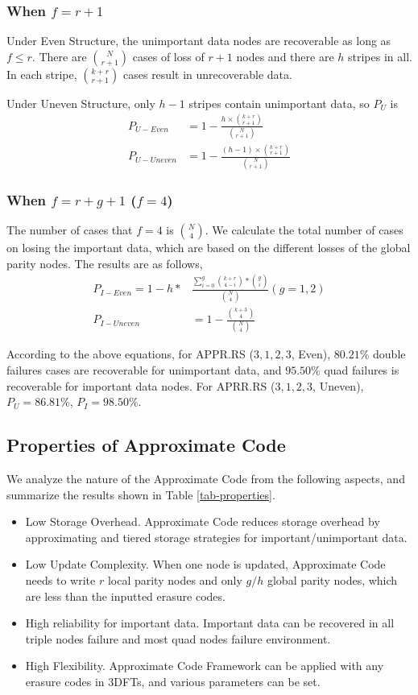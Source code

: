 \documentclass[sigconf]{acmart}
\begin{document}
\subsubsection{When $f=r+1$}
Under Even Structure, the unimportant data nodes are recoverable as long as $f \leqslant r$.
There are $\binom{N}{r+1}$ cases of loss of $r+1$ nodes and there are $h$ stripes in all. In each stripe, $\binom{k+r}{r+1}$ cases result in unrecoverable data.

Under Uneven Structure, only $h-1$ stripes contain unimportant data, so $P_{U}$ is
\begin{align}
    P_{U-Even} &= 1 - \frac{h \times \binom{k+r}{r+1}}{\binom{N}{r+1}}\\
    P_{U-Uneven} &= 1 - \frac{(h-1) \times \binom{k+r}{r+1}}{\binom{N}{r+1}}
\end{align}

\subsubsection{When $f=r+g+1$ ($f=4$)}
The number of cases that $f=4$ is $\binom{N}{4}$.
We calculate the total number of cases on losing the important data, which are based on the different losses of the global parity nodes. The results are as follows,
\begin{align}
    P_{I-Even} = 1 - h*&\frac{\sum_{i=0}^{g} {\binom{k+r}{4-i}*\binom{g}{i}} }{\binom{N}{4}}  (g=1,2)\\
    P_{I-Uneven} &= 1 - \frac{\binom{k+3}{4}}{\binom{N}{4}}
\end{align}

According to the above equations, for APPR.RS ($3,1,2,3$, Even), $80.21\%$ double failures cases are recoverable for unimportant data, and $95.50\%$ quad failures is recoverable for important data nodes. For APRR.RS ($3,1,2,3$, Uneven), $P_U=86.81\%$, $P_{I}=98.50\%$.

\subsection{Properties of Approximate Code}\label{properties}

We analyze the nature of the Approximate Code from the following aspects, and summarize the results shown in Table \ref{tab-properties}.
\begin{itemize}
    \item Low Storage Overhead. Approximate Code reduces storage overhead by approximating and tiered storage strategies for important/unimportant data. 
    \item Low Update Complexity. When one node is updated, Approximate Code needs to write $r$ local parity nodes and only $g/h$ global parity nodes, which are less than the inputted erasure codes.
    \item High reliability for important data. Important data can be recovered in all triple nodes failure and most quad nodes failure environment.
    \item High Flexibility. Approximate Code Framework can be applied with any erasure codes in 3DFTs, and various parameters can be set.
\end{itemize}
\end{document}
